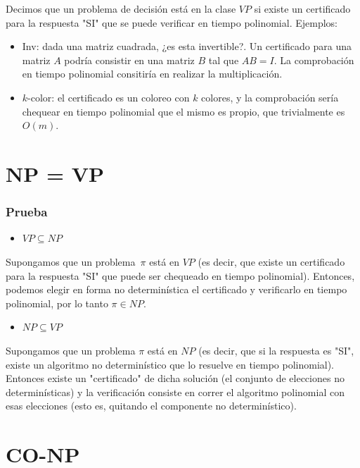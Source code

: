 \documentclass[10pt,a4paper]{article}
\begin{document}
Decimos que un problema de decisión está en la clase $VP$ si existe un certificado para la respuesta "SI" que se puede verificar en tiempo polinomial. Ejemplos:

\begin{itemize}

	\item Inv: dada una matriz cuadrada, ¿es esta invertible?. Un certificado para una matriz $A$ podría consistir en una matriz $B$ tal que $AB = I$. La comprobación en tiempo polinomial consitiría en realizar la multiplicación.
	\item $k$-color: el certificado es un coloreo con $k$ colores, y la comprobación sería chequear en tiempo polinomial que el mismo es propio, que trivialmente es $O(m)$.
\end{itemize}

\section*{NP = VP}

\subsubsection*{Prueba}

\begin{itemize}

	\item $VP \subseteq NP$
\end{itemize}

Supongamos que un problema $\pi$ está en $VP$ (es decir, que existe un certificado para la respuesta "SI" que puede ser chequeado en tiempo polinomial). Entonces, podemos elegir en forma no determinística el certificado y verificarlo en tiempo polinomial, por lo tanto $\pi \in NP$.

\begin{itemize}

	\item $NP \subseteq VP$
\end{itemize}

Supongamos que un problema $\pi$ está en $NP$ (es decir, que si la respuesta es "SI", existe un algoritmo no determinístico que lo resuelve en tiempo polinomial). Entonces existe un "certificado" de dicha solución (el conjunto de elecciones no determinísticas) y la verificación consiste en correr el algoritmo polinomial con esas elecciones (esto es, quitando el componente no determinístico).

\section*{CO-NP}
\end{document}
